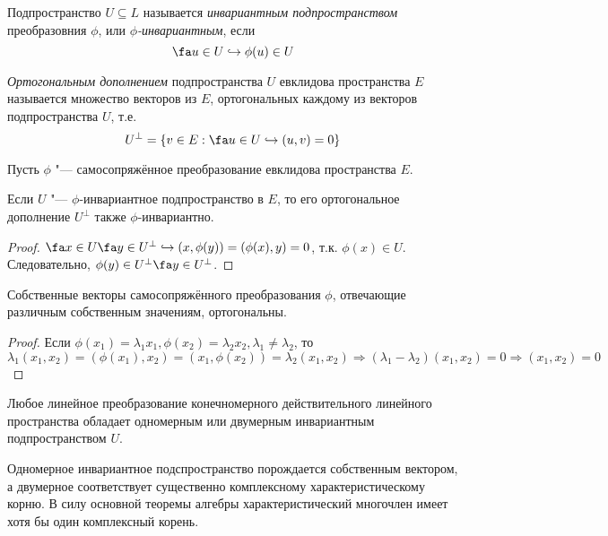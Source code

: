   \begin{defn}
  Подпространство $U \subseteq L$ называется \textit{инвариантным подпространством} преобразовния $\phi$, или \textit{$\phi$-инвариантным}, если
  \begin{equation}\label{23.1.invariant}
  \fa u \in U \hookrightarrow \phi(u) \in U
  \end{equation}
  \end{defn} 
  
  \begin{defn}
  \textit{Ортогональным дополнением} подпространства $U$ евклидова пространства $E$ называется множество векторов из $E$, ортогональных каждому из векторов подпространства $U$, т.е.
  \begin{equation}\label{23.1.orthogonal}
  U^\perp=\{v \in E: \fa u \in U \hookrightarrow (u,v)=0\}
  \end{equation}
  \end{defn}
  
  Пусть $\phi$ "--- самосопряжённое преобразование евклидова \linebreak пространства $E$.
  \begin{stt}\label{23.1.stt_orth}
  Если $U$ "--- $\phi$-инвариантное подпространство в $E$, то его ортогональное дополнение $U^\perp$ также $\phi$-инвариантно.
  \end{stt}
  \begin{proof}
  $\fa x \in U \fa y \in U^\perp \hookrightarrow (x,\phi(y))=(\phi(x),y)=0$, т.к. $\phi(x)\in U$. Следовательно, $\phi(y)\in U^\perp \fa y\in U^\perp$.
  \end{proof}
  
  \begin{stt}
  Собственные векторы самосопряжённого преобразования $\phi$, отвечающие различным собственным значениям, ортогональны.
  \end{stt}
  \begin{proof}
  Если $\phi(x_1)=\lambda_1 x_1, \phi(x_2)=\lambda_2 x_2, \lambda_1 \neq \lambda_2$, то $\lambda_1(x_1,x_2)=(\phi(x_1),x_2)=(x_1,\phi(x_2))=\lambda_2(x_1,x_2) \Rightarrow (\lambda_1-\lambda_2)(x_1,x_2)=0 \Rightarrow (x_1,x_2)=0$
  \end{proof}    
    
  \begin{lemm}\label{23.1.lemm}
  Любое линейное преобразование конечномерного действительного линейного пространства обладает одномерным или двумерным инвариантным подпространством $U$.
  \end{lemm}
  \begin{notion}
  Одномерное инвариантное подспространство порождается собственным вектором, а двумерное соответствует существенно комплексному характеристическому корню. В силу основной теоремы алгебры характеристический многочлен имеет хотя бы один комплексный корень.
  \end{notion}
  
